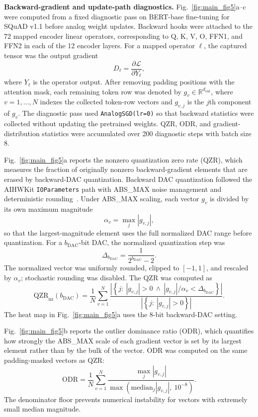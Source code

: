 \documentclass[fleqn,10pt]{wlscirep}
\begin{document}
\noindent\textbf{Backward-gradient and update-path diagnostics.}
Fig.~\ref{fig:main_fig5}a--c were computed from a fixed diagnostic pass on BERT-base fine-tuning for SQuAD v1.1 before analog weight updates. 
Backward hooks were attached to the 72 mapped encoder linear operators, corresponding to Q, K, V, O, FFN1, and FFN2 in each of the 12 encoder layers. 
For a mapped operator \(\ell\), the captured tensor was the output gradient
\[
D_{\ell}=\frac{\partial \mathcal{L}}{\partial Y_{\ell}},
\]
where \(Y_{\ell}\) is the operator output. 
After removing padding positions with the attention mask, each remaining token row was denoted by
\(g_v\in\mathbb{R}^{d_{\mathrm{out}}}\), where \(v=1,\ldots,N\) indexes the collected token-row vectors and \(g_{v,j}\) is the \(j\)th component of \(g_v\). 
The diagnostic pass used \texttt{AnalogSGD(lr=0)} so that backward statistics were collected without updating the pretrained weights. 
QZR, ODR, and gradient-distribution statistics were accumulated over 200 diagnostic steps with batch size 8.

Fig.~\ref{fig:main_fig5}a reports the nonzero quantization zero rate (QZR), which measures the fraction of originally nonzero backward-gradient elements that are erased by backward-DAC quantization. 
Backward DAC quantization followed the AIHWKit \texttt{IOParameters} path with ABS\_MAX noise management and deterministic rounding~\cite{rasch2021aihwkit,legallo2023aihwkit}. 
Under ABS\_MAX scaling, each vector \(g_v\) is divided by its own maximum magnitude
\[
\alpha_v=\max_j |g_{v,j}|,
\]
so that the largest-magnitude element uses the full normalized DAC range before quantization. 
For a \(b_{\mathrm{DAC}}\)-bit DAC, the normalized quantization step was
\[
\Delta_{b_{\mathrm{DAC}}}=\frac{1}{2^{b_{\mathrm{DAC}}}-2}.
\]
The normalized vector was uniformly rounded, clipped to \([-1,1]\), and rescaled by \(\alpha_v\); stochastic rounding was disabled. 
The QZR was computed as
\begin{equation}
\mathrm{QZR}_{\mathrm{nz}}(b_{\mathrm{DAC}})
=
\frac{1}{N}
\sum_{v=1}^{N}
\frac{
\left|\left\{j:\ |g_{v,j}|>0\ \wedge\ |g_{v,j}|/\alpha_v < \Delta_{b_{\mathrm{DAC}}}\right\}\right|
}{
\left|\left\{j:\ |g_{v,j}|>0\right\}\right|
}.
\label{eq:qzr_def}
\end{equation}
The heat map in Fig.~\ref{fig:main_fig5}a uses the 8-bit backward-DAC setting.

Fig.~\ref{fig:main_fig5}b reports the outlier dominance ratio (ODR), which quantifies how strongly the ABS\_MAX scale of each gradient vector is set by its largest element rather than by the bulk of the vector. 
ODR was computed on the same padding-masked vectors as QZR:
\begin{equation}
\mathrm{ODR}
=
\frac{1}{N}
\sum_{v=1}^{N}
\frac{
\max_j |g_{v,j}|
}{
\max\left(\mathrm{median}_j |g_{v,j}|,\ 10^{-8}\right)
}.
\label{eq:odr_def}
\end{equation}
The denominator floor prevents numerical instability for vectors with extremely small median magnitude.
\end{document}
